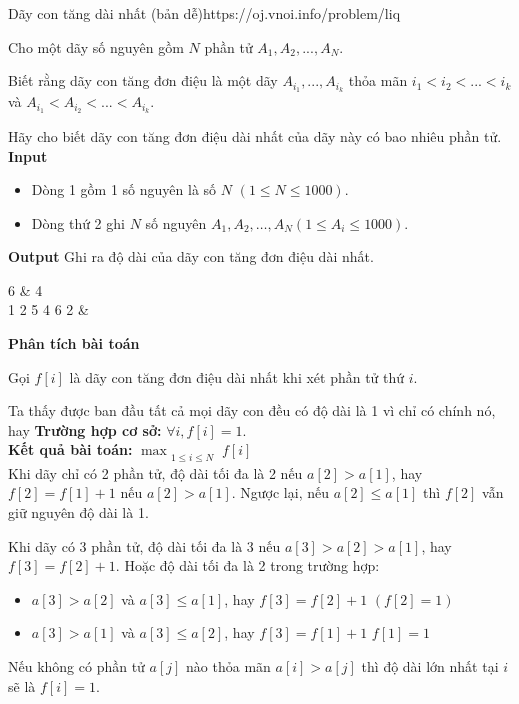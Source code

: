 \begin{baitap}{Dãy con tăng dài nhất (bản dễ)}{https://oj.vnoi.info/problem/liq}

Cho một dãy số nguyên gồm $N$ phần tử $A_1, A_2,...,A_N$.

Biết rằng dãy con tăng đơn điệu là một dãy $A_{i_1},...,A_{i_k}$ thỏa mãn $i_1 < i_2 <...<i_k$ và $A_{i_1} < A_{i_2} <...<A_{i_k}$. 

Hãy cho biết dãy con tăng đơn điệu dài nhất của dãy này có bao nhiêu phần tử.
\textbf{Input}
\begin{itemize}[noitemsep]
  \item Dòng 1 gồm 1 số nguyên là số $N$ $(1 \leq N \leq 1000)$.
  \item Dòng thứ 2 ghi $N$ số nguyên $A_1, A_2, \dots, A_N (1 \leq A_i \leq 1000)$.
\end{itemize}

\textbf{Output}
Ghi ra độ dài của dãy con tăng đơn điệu dài nhất.

\end{baitap}

\begin{sampleio}
6 & 4 \\
1 2 5 4 6 2 & \\
\end{sampleio}

\textbf{Phân tích bài toán}

Gọi \( f[i] \) là dãy con tăng đơn điệu dài nhất khi xét phần tử thứ $i$.

Ta thấy được ban đầu tất cả mọi dãy con đều có độ dài là 1 vì chỉ có chính nó, hay \textbf{Trường hợp cơ sở:} $\forall i, f[i] = 1$.\\

\textbf{Kết quả bài toán:} $\max_{\substack{1 \leq i \leq N}} f[i]$\\


Khi dãy chỉ có 2 phần tử, độ dài tối đa là 2 nếu $a[2] > a[1]$, hay $f[2] = f[1] + 1$ nếu $a[2] > a[1]$. Ngược lại, nếu $a[2] \leq a[1]$ thì $f[2]$ vẫn giữ nguyên độ dài là 1.

Khi dãy có 3 phần tử, độ dài tối đa là 3 nếu $a[3] > a[2] > a[1]$, hay $f[3] = f[2] + 1$. Hoặc độ dài tối đa là 2 trong trường hợp:
\begin{itemize}
    \item $a[3] > a[2]$ và $a[3] \leq a[1]$, hay $f[3] = f[2] + 1$ $(f[2] = 1)$
    \item $a[3] > a[1]$ và $a[3] \leq a[2]$, hay $f[3] = f[1] + 1$ $f[1] = 1$
\end{itemize}
Nếu không có phần tử $a[j]$ nào thỏa mãn $a[i] > a[j]$ thì độ dài lớn nhất tại $i$ sẽ là $f[i] =  1$.


